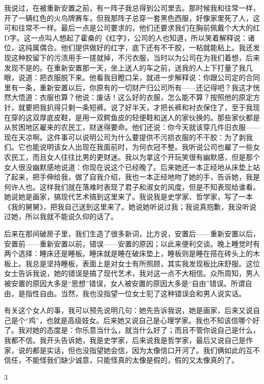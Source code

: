 我说过，在被重新安置之前，有一阵子我总得到公司里去。那时候我和往常一样，开了一辆红色的火鸟牌赛车，但我那阵子总穿一套黑色西服，好像家里死了人，这可和往常不一样。最后一点是公司要求的，他们还要求我们在胸前佩戴个大大的红D字。这一点叫人想起了霍桑的《红字》，公司的人也知道，所以笑着解释说：诸位，这纯属偶合。他们提供做好的红字，底下还有不干胶，一粘就能粘上。我还发现这种胶留下的污渍用手一搓就掉，不污衣服，当时以为公司在为我们着想，后来发现不是的。在重新安置那一天，坐上送人的车之前，送我的人上下打量了我几眼，说道：把衣服脱下来。他看我目瞪口呆，就进一步解释说：你跟公司定的合同里有一条，重新安置以后，你原有的一切财产归公司所有——还记得吧？我这才恍然大悟道：衣服也算？他说：废话！这么好的衣服，怎么能不算？按照他的原定方针，就要把我扒得只剩一条短裤。说了好半天，才把长裤和衬衣保住了，至于我现在穿的这双厚底皮鞋，是用一双鳄鱼皮的轻便鞋和送人的家伙换的。那些家伙都是从贫困地区雇来的农民工，财迷得要命。他们还说：你今天就该穿几件旧衣服——现在天凉啊。这件事可以说明公司为什么要提供不污损衣服的不干胶：为了剥我们。它也能说明该女人出现在我面前时，为何衣冠不整。我听说公司也雇了一些女农民工，而且女人往往比男的更财迷。我以为拿这个开玩笑很有幽默感，但是那个女人很没幽默感地说道：你现在说这个已经晚了。后来她还一本正经地从床垫上站了起来，把手伸给我，做了自我介绍，我也一本正经地吻了她的手，告诉她，我是何许人也。这样我们就在落难时表现了君子和淑女的风度，但是不知表现给谁看。她说她是画家，搞现代艺术搞到这里来了。我说我是史学家、哲学家，写了一本《我的舅舅》，把我自己送到这里来了。她说她听说过我；我说真抱歉，我没听说过她，所以我就不能说久仰的话了。 

后来在那间破房子里，我们生造了很多新词，比方说，安置后——重新安置以后，安置前——重新安置以前，错误——安置的原因；以此来便利交谈。晚上睡觉时有两个选择：睡床还是睡板。睡床就是睡在破床垫上，睡板则是睡在搭在砖头上的木板上。我总是坚持睡板，表面上是对女士有所照顾，其实我发现板比床舒服。这位女士告诉我说，她的错误是搞了现代艺术，我对这一点不大相信。众所周知，男人被安置的原因大多是“思想”错误，女人被安置的原因大多是“自由”错误。所谓自由，是指性自由。当然，我也没指望一位女士犯了这种错误会和男人说实话。 

有关这个女人的事，我可以预先说明几句：她先告诉我说，她是画家，后来又说自己是个“鸡”，也就是高级妓女。后来她又说自己是心理学家。我也不知该信哪个好了。我对她的态度是：你乐意当什么，就当什么好了；而且不管你说自己是什么，我都不信。我开头告诉她，我是史学家，后来说我是哲学家，最后又说自己是作家，说的都是实话，但也没指望她会信，因为太像信口开河了。我们俩如此的互不信任，不能怪我们缺少诚意，只能怪真的太像是假的，假的又太像真的了。 

3 


